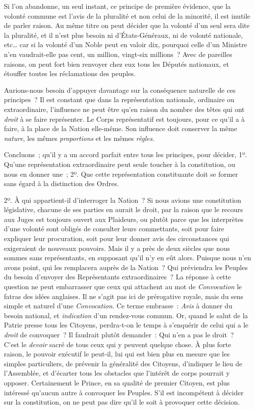 \documentclass[french,twoside]{book} %
\begin{document}
Si l’on abandonne, un seul instant, ce principe de première évidence, que la volonté commune est l’avis de la pluralité et non celui de la minorité, il est inutile de parler raison. Au même titre on peut décider que la volonté d’un seul sera dite la pluralité, et il n’est plus besoin ni d’États-Généraux, ni de volonté nationale, etc… car si la volonté d’un Noble peut en valoir dix, pourquoi celle d’un Ministre n’en vaudrait-elle pas cent, un million, vingt-six millions ? Avec de pareilles raisons, on peut fort bien renvoyer chez eux tous les Députés nationaux, et étouffer toutes les réclamations des peuples.\par
Aurions-nous besoin d’appuyer davantage sur la conséquence naturelle de ces principes ? Il est constant que dans la représentation nationale, ordinaire ou extraordinaire, l’influence ne peut être qu’en raison du nombre des têtes qui ont {\itshape droit} à se faire représenter. Le Corps représentatif est toujours, pour ce qu’il a à faire, à la place de la Nation elle-même. Son influence doit conserver la même {\itshape nature}, les mêmes {\itshape proportions} et les mêmes {\itshape règles}.\par
Concluons ; qu’il y a un accord parfait entre tous les principes, pour décider, 1º. Qu’une représentation extraordinaire peut seule toucher à la constitution, ou nous en donner une ; 2º. Que cette représentation constituante doit se former sans égard à la distinction des Ordres.\par
2º. À qui appartient-il d’interroger la Nation ? Si nous avions une constitution législative, chacune de ses parties en aurait le droit, par la raison que le recours aux Juges est toujours ouvert aux Plaideurs, ou plutôt parce que les interprètes d’une volonté sont obligés de consulter leurs commettants, soit pour faire expliquer leur procuration, soit pour leur donner avis des circonstances qui exigeraient de nouveaux pouvoirs. Mais il y a près de deux siècles que nous sommes sans représentants, en supposant qu’il n’y en eût alors. Puisque nous n’en avons point, qui les remplacera auprès de la Nation ? Qui préviendra les Peuples du besoin d’envoyer des Représentants extraordinaires ? La réponse à cette question ne peut embarrasser que ceux qui attachent au mot de {\itshape Convocation} le fatras des idées anglaises. Il ne s’agit pas ici de prérogative royale, mais du sens simple et naturel d’une {\itshape Convocation}. Ce terme embrasse : {\itshape Avis} à donner du besoin national, et {\itshape indication} d’un rendez-vous commun. Or, quand le salut de la Patrie presse tous les Citoyens, perdra-t-on le temps à s’enquérir de celui qui a le {\itshape droit} de convoquer ? Il faudrait plutôt demander : Qui n’en a pas le droit ? C’est le {\itshape devoir} sacré de tous ceux qui y peuvent quelque chose. À plus forte raison, le pouvoir exécutif le peut-il, lui qui est bien plus en mesure que les simples particuliers, de prévenir la généralité des Citoyens, d’indiquer le lieu de l’Assemblée, et d’écarter tous les obstacles que l’intérêt de corps pourrait y opposer. Certainement le Prince, en sa qualité de premier Citoyen, est plus intéressé qu’aucun autre à convoquer les Peuples. S’il est incompétent à décider sur la constitution, on ne peut pas dire qu’il le soit à provoquer cette décision.\par
\end{document}
